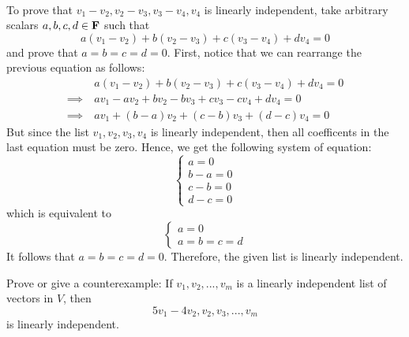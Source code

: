 \begin{solution}
    \\ To prove that $v_1 - v_2, v_2 - v_3, v_3 - v_4, v_4$ is linearly independent, take arbitrary scalars $a,b,c,d \in \mathbf{F}$ such that 
    $$a(v_1 - v_2) +  b(v_2 - v_3) + c(v_3 - v_4) + d v_4 = 0$$
    and prove that $a=b=c=d=0$. First, notice that we can rearrange the previous equation as follows:
    \begin{align*}
        & a(v_1 - v_2) +  b(v_2 - v_3) + c(v_3 - v_4) + d v_4 = 0 \\
        \implies \ & av_1 - av_2 +  bv_2 - bv_3 + cv_3 - cv_4 + d v_4 = 0 \\
        \implies \ & av_1 + (b-a)v_2 + (c-b)v_3 + (d-c)v_4 = 0
    \end{align*}
    But since the list $v_1, v_2, v_3, v_4$ is linearly independent, then all coefficents in the last equation must be zero. Hence, we get the following system of equation:
    $$\begin{cases} a = 0 \\ b-a = 0 \\ c-b = 0 \\ d-c = 0 \end{cases}$$
    which is equivalent to
    $$\begin{cases} a = 0 \\ a=b=c=d \end{cases}$$
    It follows that $a =b=c=d=0$. Therefore, the given list is linearly independent. \\
\end{solution}

\begin{exercise}
    Prove or give a counterexample: If $v_1, v_2, ..., v_m$ is a linearly independent list of vectors in $V$, then 
    $$5v_1 - 4v_2, v_2, v_3, ..., v_m$$
    is linearly independent. \\
\end{exercise}

